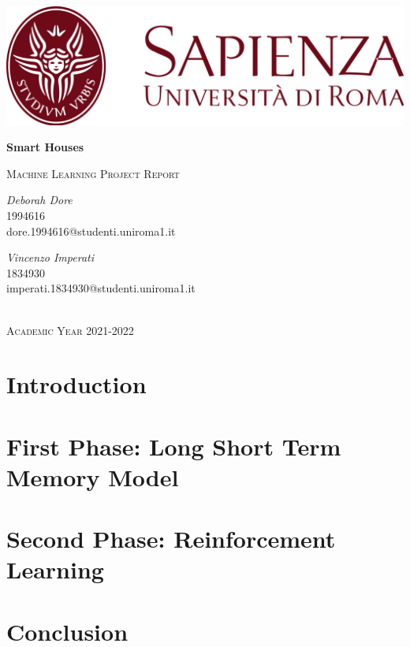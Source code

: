 \documentclass[12pt]{article}
\begin{document}
\begin{titlepage}
\thispagestyle{empty}
\center

\includegraphics[scale=0.2]{logo_uniroma1.png}\\[3cm]


{\Huge \bfseries Smart Houses
\par}\vspace{1cm}
\textsc{\Large Machine Learning Project Report}\\[4cm]

\begin{minipage}{\textwidth}
\begin{flushleft} \large
\textit{Deborah Dore}\\[0.3cm]
1994616 \\[0.2cm]
dore.1994616@studenti.uniroma1.it
\end{flushleft}
\end{minipage}

\begin{minipage}{\textwidth}
\begin{flushright} \large
\textit{Vincenzo Imperati}\\[0.3cm]
1834930\\[0.2cm]
imperati.1834930@studenti.uniroma1.it
\end{flushright}
\end{minipage}
\\[5cm]
\textsc{\large Academic Year 2021-2022}

\vfill %
\end{titlepage}

\newpage
\tableofcontents 

\newpage
\begin{abstract}
    
\end{abstract}

\newpage
\section{Introduction}


\newpage
\section{First Phase: Long Short Term Memory Model}


\newpage
\section{Second Phase: Reinforcement Learning}


\newpage
\section{Conclusion}



\newpage
\printbibliography
\end{document}
